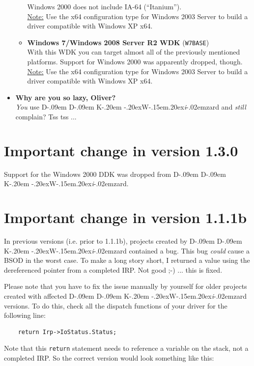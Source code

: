 \documentclass[a4paper,titlepage]{report}
\def\ddkwiz{D\kern-.09em D\kern-.09em K\kern-.20em \raise-.20ex\hbox{W}\kern-.15em\raise.20ex\hbox{\it{i}}\kern-.02em{zard}}
\begin{document}
\begin{itemize}
\begin{itemize}
            Windows 2000 does not include IA-64 (``Itanium'').\\
            \underline{Note:} Use the x64 configuration type for Windows 2003 Server to
            build a driver compatible with Windows XP x64.
          \item
            \textbf{Windows 7/Windows 2008 Server R2 WDK} (\texttt{W7BASE})\\
            With this WDK
            you can target almost all of the previously mentioned platforms. Support for
            Windows 2000 was apparently dropped, though.\\
            \underline{Note:} Use the x64 configuration type for Windows 2003 Server to
            build a driver compatible with Windows XP x64.


        \end{itemize}
  \item \textbf{Why are you so lazy, Oliver?}\\
        \emph{You} use \ddkwiz{} and \emph{still} complain? Tss tss ...
\end{itemize}

\section{Important change in version 1.3.0}
Support for the Windows 2000 DDK was dropped from \ddkwiz{}.

\section{Important change in version 1.1.1b}
In previous versions (i.e. prior to 1.1.1b), projects created by \ddkwiz{} contained
a bug. This bug \emph{could} cause a BSOD in the worst case. To make a long story short,
I returned a value using the dereferenced pointer from a completed IRP. Not good \textsf{;-)}
... this is fixed.

Please note that you have to fix the issue manually by yourself for older projects created
with affected \ddkwiz{} versions. To do this, check all the dispatch functions of your driver
for the following line:

\begin{verbatim}
    return Irp->IoStatus.Status;
\end{verbatim}

Note that this \texttt{return} statement needs to reference a variable on the stack, not a completed
IRP. So the correct version would look something like this:
\end{document}
